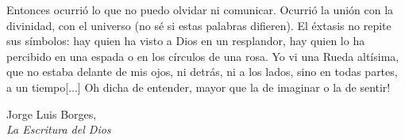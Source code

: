 \epigraph{
  Entonces ocurri\'{o} lo que no puedo olvidar ni comunicar. Ocurri\'{o} la uni\'{o}n con la divinidad, con el universo (no s\'{e} si estas palabras difieren). El \'{e}xtasis no repite sus s\'{i}mbolos: hay quien ha visto a Dios en un resplandor, hay quien lo ha percibido en una espada o en los c\'{i}rculos de una rosa. Yo vi una Rueda alt\'{i}sima, que no estaba delante de mis ojos, ni detr\'{a}s, ni a los lados, sino en todas partes, a un tiempo[...] \textexclamdown Oh dicha de entender, mayor que la de imaginar o la de sentir!}{Jorge Luis Borges,\\ \textit{La Escritura del Dios}}

\newpage{\pagestyle{empty}\cleardoublepage}

\newpage
\thispagestyle{empty} \textbf{}\normalsize




